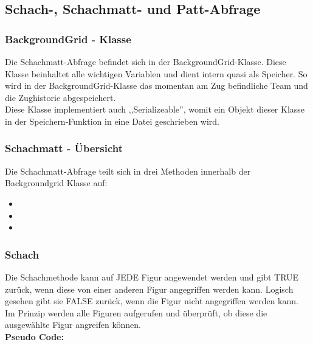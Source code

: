 \documentclass[12pt,a4paper]{article}
\begin{document}
\newpage
\subsection{Schach-, Schachmatt- und Patt-Abfrage}
\label{SUBSEC:checkmate}

\subsubsection{BackgroundGrid - Klasse}

Die Schachmatt-Abfrage befindet sich in der BackgroundGrid-Klasse. Diese Klasse beinhaltet alle wichtigen Variablen und dient intern quasi als Speicher. So wird in der BackgroundGrid-Klasse das momentan am Zug befindliche Team und die Zughistorie abgespeichert. \\
Diese Klasse implementiert auch ,,Serializeable'', womit ein Objekt dieser Klasse in der Speichern-Funktion in eine Datei geschrieben wird. \\

\subsubsection{Schachmatt - Übersicht}

Die Schachmatt-Abfrage teilt sich in drei Methoden innerhalb der Backgroundgrid Klasse auf:
\begin{itemize}
	\item{}
	\item{}
	\item{}
\end{itemize}



\subsubsection{Schach}
\label{SUBSUBSEC:check}

Die Schachmethode kann auf JEDE Figur angewendet werden und gibt TRUE zurück, wenn diese von einer anderen Figur angegriffen werden kann. Logisch gesehen gibt sie FALSE zurück, wenn die Figur nicht angegriffen werden kann. \\
Im Prinzip werden alle Figuren aufgerufen und überprüft, ob diese die ausgewählte Figur angreifen können. \\
\newpage
\textbf{Pseudo Code:}
\end{document}
